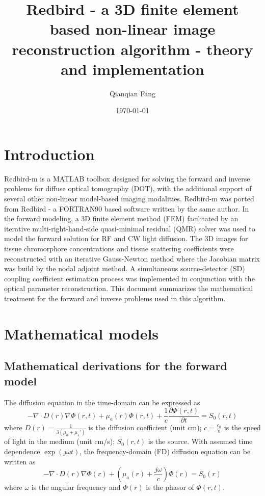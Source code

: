 \documentclass[12pt]{book}               %
\title{Redbird \-- a 3D finite element based non-linear image reconstruction algorithm \-- theory and implementation}
\author{Qianqian Fang}
\date{\today}
\begin{document}
\maketitle              %

\chapter{Introduction}

Redbird-m is a MATLAB toolbox designed for solving the forward and inverse
problems for diffuse optical tomography (DOT), with the additional support of 
several other non-linear model-based imaging modalities. Redbird-m was ported from 
Redbird - a FORTRAN90 based software written by the same author.
In the forward modeling, a 3D finite element method (FEM)
facilitated by an iterative multi-right-hand-side quasi-minimal residual (QMR) solver was used to model
the forward solution for RF and CW light diffusion. The 3D images for tissue chromorphore 
concentrations and tissue scattering coefficients were
reconstructed with an iterative Gauss-Newton method where the
Jacobian matrix was build by the nodal adjoint method. A simultaneous 
source-detector (SD) coupling coefficient estimation process was 
implemented in conjunction with the optical parameter reconstruction. 
This document summarizes the mathematical treatment for the forward 
and inverse problems used in this algorithm.

\chapter{Mathematical models}

\section{Mathematical derivations for the forward model}
The diffusion equation in the time-domain can be expressed as
\begin{equation}
\label{eq:diffusionTD} -\nabla\cdot
D(r)\nabla\Phi(r,t)+\mu_a(r)\Phi(r,t)+\frac{1}{c}\frac{\partial
\Phi(r,t)}{\partial t}=S_0(r,t)
\end{equation}
where $D(r)=\frac{1}{3(\mu_a+\mu_s')}$ is the diffusion
coefficient (unit cm); $c=\frac{c_0}{n}$ is the speed of light in the
medium (unit cm/s); $S_0(r,t)$ is the source. With assumed time dependence
$\exp(j\omega t)$, the frequency-domain (FD) diffusion equation can be
written as
\begin{equation}
\label{eq:diffusionFD} -\nabla\cdot
D(r)\nabla\Phi(r)+\left(\mu_a(r)+\frac{j\omega}{c}\right)\Phi(r)=S_0(r)
\end{equation}
where $\omega$ is the angular frequency and $\Phi(r)$ is the
phasor of $\Phi(r,t)$.
\end{document}
